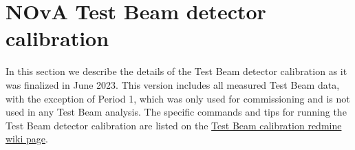\documentclass[12pt,a4paper]{article}
\begin{document}
\FloatBarrier

\section{NOvA Test Beam detector calibration}
In this section we describe the details of the Test Beam detector calibration as it was finalized in June 2023. This version includes all measured Test Beam data, with the exception of Period 1, which was only used for commissioning and is not used in any Test Beam analysis. The specific commands and tips for running the Test Beam detector calibration are listed on the \href{https://cdcvs.fnal.gov/redmine/projects/novaart/wiki/Test\_Beam\_Calibration\_Instructions}{Test Beam calibration redmine wiki page}.

\end{document}

